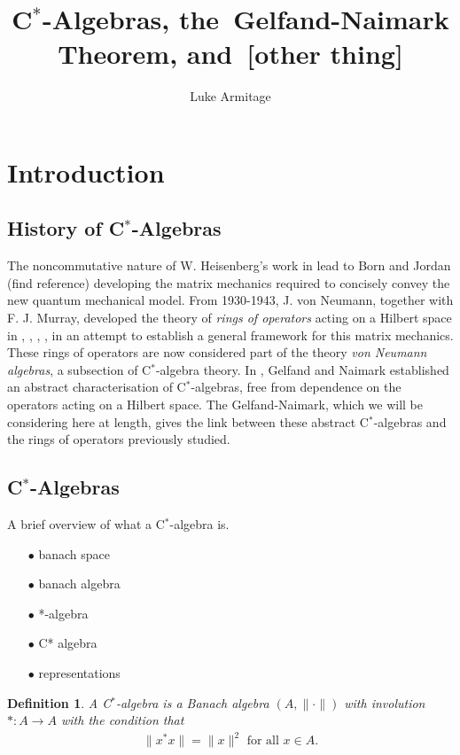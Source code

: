 \documentclass[12pt,a4paper]{amsart}
\author{Luke Armitage}
\title{C$^\ast$-Algebras, the~Gelfand-Naimark Theorem, and~[other thing]}
\theoremstyle{plain}
\theoremstyle{defn}
\newtheorem{defn}{Definition}
\begin{document}
\maketitle
\section{Introduction}
\subsection{History of C$^\ast$-Algebras}
	The noncommutative nature of W. Heisenberg's work in \cite{heisenberg25} lead to Born and Jordan (find reference) developing the matrix mechanics required to concisely convey the new quantum mechanical model. 
	From 1930-1943, J. von Neumann, together with F. J. Murray, developed the theory of \emph{rings of operators} acting on a Hilbert space in \cite{vonneumann35}, \cite{vonneumann37}, \cite{vonneumann40}, \cite{vonneumann43}, in an attempt to establish a general framework for this matrix mechanics.
	These rings of operators are now considered part of the theory \emph{von Neumann algebras}, a subsection of C$^\ast$-algebra theory.
	In \cite{gelfand43}, Gelfand and Naimark established an abstract characterisation of C$^\ast$-algebras, free from dependence on the operators acting on a Hilbert space.
	The Gelfand-Naimark, which we will be considering here at length, gives the link between these abstract C$^\ast$-algebras and the rings of operators previously studied.
	
	
\subsection{C$^\ast$-Algebras}
	A brief overview of what a C$^\ast$-algebra is.
\begin{enumerate}
	\item[$\bullet$] banach space
	\item[$\bullet$] banach algebra
	\item[$\bullet$] *-algebra
	\item[$\bullet$] C* algebra
	\item[$\bullet$] representations
\end{enumerate}
\begin{defn}
A \emph{C$^\ast$-algebra} is a Banach algebra $(A, \| \cdot \|)$ with involution $\ast : A \to A$ with the condition that
\begin{align*}
	\|x ^\ast x\| = \|x\|^2 \mbox{ for all } x \in A.
\end{align*}
\end{defn}
 
\end{document}
